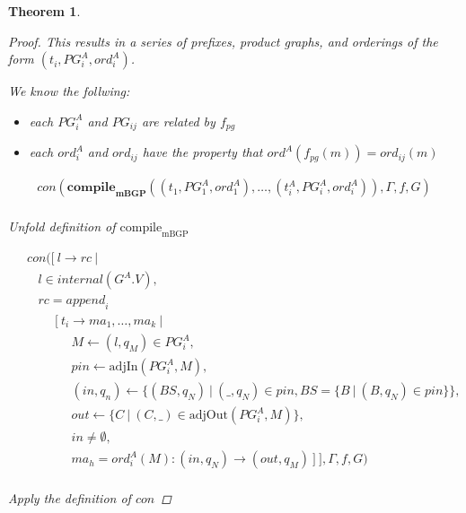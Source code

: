 \documentclass[twocolumn, openany]{sig-alternate-10pt}
\newtheorem{thm}{Theorem}
\begin{document}
\begin{thm}
\begin{proof}
    This results in a series of prefixes, product graphs, and orderings of the form $(t_i, PG^A_i, ord^A_i)$.

    We know the follwing:

    \begin{itemize}
      \item each $PG^A_i$ and $PG_{ij}$ are related by $f_{pg}$
      \vspace{-.2em}
      \item each $ord^A_i$ and $ord_{ij}$ have the property that $ord^A(f_{pg}(m)) = ord_{ij}(m)$
    \end{itemize}
    


  \[ \begin{array}{l}
     con(\textbf{compile}_\textbf{mBGP}( (t_1,PG^A_1,ord^A_1), \dots, (t^A_i,PG^A_i,ord^A_i) ), \Gamma,f,G) \\
  \end{array} \]%

Unfold definition of $\text{compile}_\text{mBGP}$

  \[ \begin{array}{l}
     ~~~~~ con([~ l \rightarrow rc ~\vert~ \\
     ~~~~~~~~~ l \in internal(G^A.V), \\
     ~~~~~~~~~ rc = \mathit{append}_i~  \\
     ~~~~~~~~~~~~~~~ [~ t_i \rightarrow ma_1, \dots, ma_k ~\vert~ \\
     ~~~~~~~~~~~~~~~~~~~~~ M \leftarrow (l,q_M) \in PG^A_i, \\
     ~~~~~~~~~~~~~~~~~~~~~ pin \leftarrow \text{adjIn}(PG^A_i,M), \\
     ~~~~~~~~~~~~~~~~~~~~~ (in,q_n) \leftarrow \{ (BS,q_N) ~\vert~ (\_,q_N) \in pin, BS=\{B ~\vert~ (B,q_N) \in pin \} \}, \\
     ~~~~~~~~~~~~~~~~~~~~~ out \leftarrow \{ C ~\vert~ (C,\_) \in \text{adjOut}(PG^A_i,M) \}, \\
     ~~~~~~~~~~~~~~~~~~~~~ in \neq \emptyset, \\
     ~~~~~~~~~~~~~~~~~~~~~ ma_h = ord^A_i(M) : (in,q_N) \rightarrow (out,q_M) ~] ~], \Gamma,f,G) \\
  \end{array} \]%

  Apply the definition of $con$


\end{proof}
\end{thm}
\end{document}
